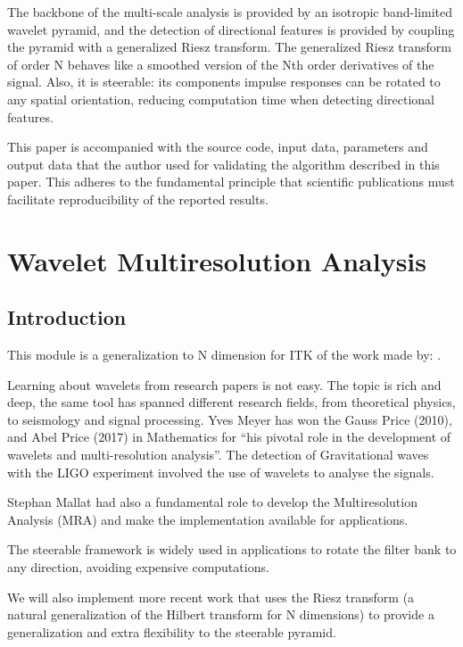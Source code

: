 The backbone of the multi-scale analysis is provided by an isotropic band-limited wavelet pyramid, and the detection of directional features is provided by coupling the pyramid with a generalized Riesz transform.
The generalized Riesz transform of order N behaves like a smoothed version of the Nth order derivatives of the signal. Also, it is steerable: its components impulse responses can be rotated to any spatial orientation, reducing computation time when detecting directional features.

This paper is accompanied with the source code, input data, parameters and
output data that the author used for validating the algorithm described in
this paper. This adheres to the fundamental principle that scientific
publications must facilitate reproducibility of the reported results.

\section{Wavelet Multiresolution Analysis}
\label{sec:first}

\subsection{Introduction}
\label{sub:introduction}
This module is a generalization to N dimension for ITK of the work made by: \cite{freeman_design_1991, simoncelli_steerable_1995, kovesi_image_1999, held_steerable_2010,chenouard_3d_2012, unser_steerable_2011, pad_vow:_2014}.

Learning about wavelets from research papers is not easy. The topic is rich and deep, the same tool has spanned different research fields, from theoretical physics, to seismology and signal processing.
Yves Meyer has won the Gauss Price (2010), and Abel Price (2017) in Mathematics for ``his pivotal role in the development of wavelets and multi-resolution analysis''. The detection of Gravitational waves with the LIGO experiment involved the use of wavelets to analyse the signals.

Stephan Mallat \cite{mallat_theory_1989} had also a fundamental role to develop the Multiresolution Analysis (MRA) and make the implementation available for applications.

The steerable framework \cite{freeman_design_1991, simoncelli_steerable_1995} is widely used in applications to rotate the filter bank to any direction, avoiding expensive computations.

We will also implement more recent work \cite{held_steerable_2010, unser_steerable_2011, chenouard_3d_2012} that uses the Riesz transform (a natural generalization of the Hilbert transform for N dimensions) to provide a generalization and extra flexibility to the steerable pyramid.

